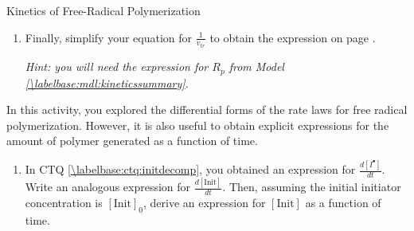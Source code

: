 \begin{activity}{Kinetics of Free-Radical Polymerization}
\begin{exercises}
\begin{enumerate}
				\begin{solution}\end{solution}
				
			\item Finally, simplify your equation for $\frac{1}{v_{tr}}$ to obtain the expression on page \pageref{\labelbase:info:vtr}.
			
				\emph{Hint: you will need the expression for $R_p$ from Model \ref{\labelbase:mdl:kineticssummary}.}
			
				\begin{solution}\end{solution}
				
		\end{enumerate}
		
	\exercise In this activity, you explored the differential forms of the rate laws for free radical polymerization.   However, it is also useful to obtain explicit expressions for the amount of polymer generated as a function of time.
	
		\begin{enumerate}
			\item In CTQ \ref{\labelbase:ctq:initdecomp}, you obtained an expression for $\frac{d[I^\bullet]}{dt}$.  Write an analogous expression for $\frac{d[\text{Init}]}{dt}$.  Then, assuming the initial initiator concentration is $[\text{Init}]_0$, derive an expression for $[\text{Init}]$ as a function of time.
			

\end{enumerate}
\end{exercises}
\end{activity}
